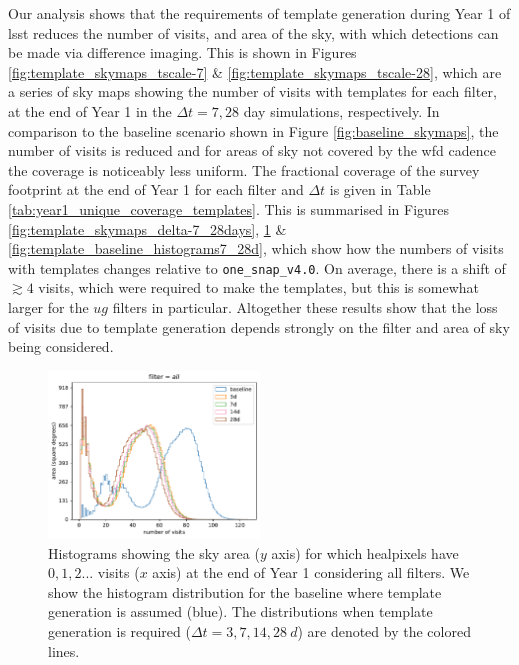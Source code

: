 \documentclass[preprintm,linenumbers]{aastex631}
\newcommand{\baseline}{\texttt{one\_snap\_v4.0}\xspace}
\begin{document}
		Our analysis shows that the requirements of template generation during Year 1 of \gls*{lsst} reduces the number of visits, and area of the sky, with which detections can be made via difference imaging.
This is shown in Figures \ref{fig:template_skymaps_tscale-7} \& \ref{fig:template_skymaps_tscale-28}, which are a series of sky maps showing the number of visits with templates for each filter, at the end of Year 1 in the $\Delta t = 7, 28$ day simulations, respectively.
In comparison to the baseline scenario shown in Figure \ref{fig:baseline_skymaps}, the number of visits is reduced and for areas of sky not covered by the \gls*{wfd} cadence the coverage is noticeably less uniform.
The fractional coverage of the survey footprint at the end of Year 1 for each filter and $\Delta t$ is given in Table \ref{tab:year1_unique_coverage_templates}.
This is summarised in Figures 
\ref{fig:template_skymaps_delta-7_28days}, \ref{fig:template_baseline_all} \& \ref{fig:template_baseline_histograms7_28d}, which show how the numbers of visits with templates changes relative to \baseline.
On average, there is a shift of $\gtrsim4$ visits, which were required to make the templates, but this is somewhat larger for the $ug$ filters in particular.
Altogether these results show that the loss of visits due to template generation depends strongly on the filter and area of sky being considered.

		\begin{figure}
			\centering
			
			\includegraphics[width=0.5\textwidth]{results/histograms/hist_first_year_one_snap_v4_0_10yrs_db_noDD_noTwi_CountMetric_doAllTemplateMetrics_reduceCount_all_noDD_noTwi.pdf}
			
			\caption{
				Histograms showing the sky area ($y$ axis) for which healpixels have $0, 1, 2...$ visits ($x$ axis) at the end of Year 1 considering all filters.
				We show the histogram distribution for the baseline where template generation is assumed (blue).
				The distributions when template generation is required ($\Delta t = 3, 7, 14, 28\ \si{d}$) are denoted by the colored lines.
			\label{fig:template_baseline_all}}
		\end{figure}
		
\end{document}
